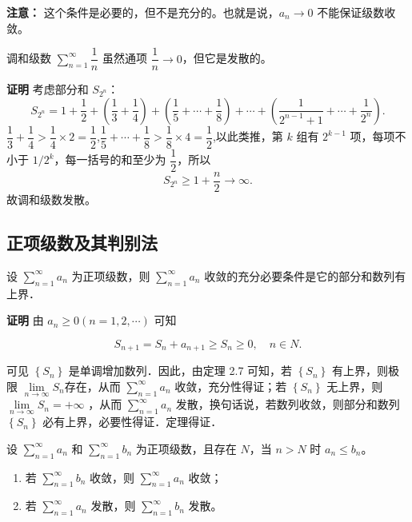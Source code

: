 \documentclass[fontset=fandol]{ctexart}
\newenvironment{custom}[1]{\par\noindent\textbf{#1}\quad}{\par\vspace{0.8em}}
\begin{document}
\textbf{注意：} 这个条件是必要的，但不是充分的。也就是说，\(a_n \to 0\) 不能保证级数收敛。

\begin{example}[调和级数]
调和级数 \(\sum\limits_{n = 1}^{  \infty } \dfrac{1}{n}\) 虽然通项 \(\dfrac{1}{n} \to 0\)，但它是发散的。
\end{example}
\begin{custom}{证明}
考虑部分和 \(S_{2^n}\)：
\[
S_{2^n} = 1 + \dfrac12 + \left(\dfrac13+\dfrac14\right) + \left(\dfrac15+\cdots+\dfrac18\right) + \cdots + \left(\dfrac{1}{2^{n-1}+1} + \cdots + \dfrac{1}{2^n}\right).
\]
$\dfrac13+\dfrac14 > \dfrac14 \times 2 =\dfrac12$,$\dfrac15+\cdots+\dfrac18>\dfrac18 \times 4 =\dfrac12$,以此类推，第 \(k\) 组有 \(2^{k-1}\) 项，每项不小于 \(1/2^k\)，每一括号的和至少为 \(\dfrac12\)，所以
\[
S_{2^n}\geq1+\dfrac n2\to\infty.
\]
故调和级数发散。
\end{custom}

\subsection{正项级数及其判别法}

\begin{theorem}
	设 $\sum\limits_{n = 1}^{  \infty } a_n$ 为正项级数，则 $\sum\limits_{n = 1}^{  \infty }a_n$ 收敛的充分必要条件是它的部分和数列有上界．
\end{theorem}


\begin{custom}{证明}
由 $a_n \geqslant 0(n=1,2, \cdots)$ 可知

$$
S_{n+1}=S_n+a_{n+1} \geqslant S_n \geqslant 0, \quad n \in N .
$$

可见 $\left\{S_n\right\}$ 是单调增加数列．因此，由定理 2.7 可知，若 $\left\{S_n\right\}$ 有上界，则极限 $\lim \limits_{n \to \infty} S_n$存在，从而 $\sum\limits_{n = 1}^{  \infty } a_n$ 收敛，充分性得证；若 $\left\{S_n\right\}$ 无上界，则 $\lim \limits_{n \to \infty} S_n=+\infty$ ，从而 $\sum\limits_{n = 1}^{  \infty } a_n$ 发散，换句话说，若数列收敛，则部分和数列 $\left\{S_n\right\}$ 必有上界，必要性得证．定理得证．

\end{custom}

\begin{theorem}[比较判别法]
设 \(\sum\limits_{n = 1}^{  \infty } a_n\) 和 \(\sum\limits_{n = 1}^{  \infty } b_n\) 为正项级数，且存在 \(N\)，当 \(n > N\) 时 \(a_n \leq b_n\)。
\begin{enumerate}
\item 若 \(\sum\limits_{n = 1}^{  \infty } b_n\) 收敛，则 \(\sum\limits_{n = 1}^{  \infty } a_n\) 收敛；
\item 若 \(\sum\limits_{n = 1}^{  \infty } a_n\) 发散，则 \(\sum\limits_{n = 1}^{  \infty } b_n\) 发散。
\end{enumerate}
\end{theorem}
\end{document}
